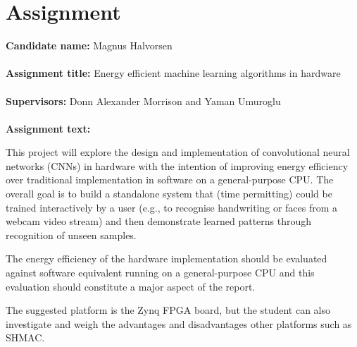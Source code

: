 \section*{Assignment}

\textbf{Candidate name:} Magnus Halvorsen \\ \hfil \\ \hfil
\textbf{Assignment title:} Energy efficient machine learning algorithms in hardware \\ \hfil \\ \hfil
\textbf{Supervisors:} Donn Alexander Morrison and Yaman Umuroglu \\ \hfil \\ \hfil
\textbf{Assignment text:} \\ \hfil


This project will explore the design and implementation of convolutional neural networks (CNNs) in hardware with the intention of improving energy efficiency over traditional implementation in software on a general-purpose CPU. The overall goal is to build a standalone system that (time permitting) could be trained interactively by a user (e.g., to recognise handwriting or faces from a webcam video stream) and then demonstrate learned patterns through recognition of unseen samples.

The energy efficiency of the hardware implementation should be evaluated against software equivalent running on a general-purpose CPU and this evaluation should constitute a major aspect of the report.

The suggested platform is the Zynq FPGA board, but the student can also investigate and weigh the advantages and disadvantages other platforms such as SHMAC.